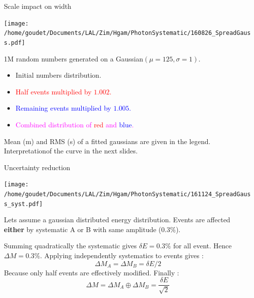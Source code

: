 \begin{frame}{Scale impact on width}
  \begin{minipage}{0.49\linewidth}\texttt{[image: /home/goudet/Documents/LAL/Zim/Hgam/PhotonSystematic/160826\_SpreadGauss.pdf]}\end{minipage}
  \hfill
  \begin{minipage}{0.49\linewidth}
    1M random numbers generated on a Gaussian$(\mu=125, \sigma=1)$.
    \begin{itemize}
    \item Initial numbers distribution.
    \item \textcolor{red}{Half events multiplied by $1.002$.}
    \item \textcolor{blue}{Remaining  events multiplied by $1.005$.}
    \item \textcolor{magenta}{Combined distribution of \textcolor{red}{red} and \textcolor{blue}{blue}.}
    \end{itemize}
  \end{minipage}
  \vfill
  Mean (m) and RMS (s) of a fitted gaussians are given in the legend.
  Interpretationof the curve in the next slides.
\end{frame}

\begin{frame}{Uncertainty reduction}
  \begin{minipage}{0.49\linewidth}\texttt{[image: /home/goudet/Documents/LAL/Zim/Hgam/PhotonSystematic/161124\_SpreadGauss\_syst.pdf]}\end{minipage}
  \hfill
  \begin{minipage}{0.49\linewidth}
    Lets assume a gaussian distributed energy distribution.
    Events are affected {\bf either} by systematic A or B with same amplitude ($0.3\%$).
  \end{minipage}
  Summing quadratically the systematic gives $\delta E=0.3\%$ for all event.
  Hence $\Delta M=0.3\%$.
  \vfill
  Applying independently systematics to events gives :
  $$ \Delta M_A = \Delta M_B = \delta E /2$$
  Because only half events are effectively modified.
  Finally :
  $$\Delta M = \Delta M_A \oplus \Delta M_B = \frac{\delta E}{\sqrt{2}}$$
\end{frame}

